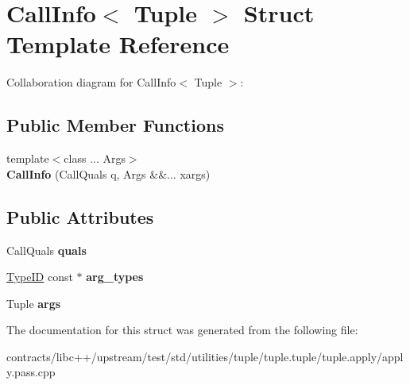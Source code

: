 \hypertarget{struct_call_info}{}\section{Call\+Info$<$ Tuple $>$ Struct Template Reference}
\label{struct_call_info}


Collaboration diagram for Call\+Info$<$ Tuple $>$\+:
\subsection*{Public Member Functions}
\begin{DoxyCompactItemize}
\item 
\mbox{\label{struct_call_info_a93a6d9d94ae536c877b1bbbcefa83e6e}} 
{\footnotesize template$<$class ... Args$>$ }\\{\bfseries Call\+Info} (Call\+Quals q, Args \&\&... xargs)
\end{DoxyCompactItemize}
\subsection*{Public Attributes}
\begin{DoxyCompactItemize}
\item 
\mbox{\label{struct_call_info_aafcc2c6c880a66783e90f4ff28c386c7}} 
Call\+Quals {\bfseries quals}
\item 
\mbox{\label{struct_call_info_a23b3debaf478690b6f3b7070005a1b58}} 
\mbox{\hyperlink{struct_type_i_d}{Type\+ID}} const  $\ast$ {\bfseries arg\+\_\+types}
\item 
\mbox{\label{struct_call_info_af4f6328fdd7520dc15cfd67771441a68}} 
Tuple {\bfseries args}
\end{DoxyCompactItemize}


The documentation for this struct was generated from the following file\+:\begin{DoxyCompactItemize}
\item 
contracts/libc++/upstream/test/std/utilities/tuple/tuple.\+tuple/tuple.\+apply/apply.\+pass.\+cpp\end{DoxyCompactItemize}
